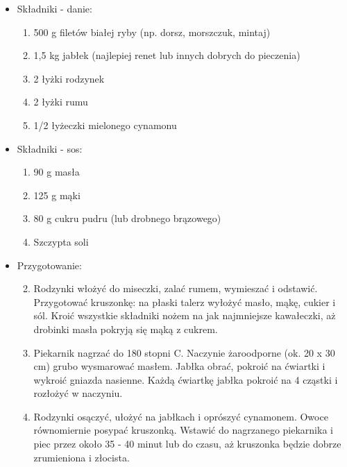 \begin{itemize}
    \item {Składniki - danie:}
    \begin{enumerate}[label={\arabic*\textendash}, align=right]
        \item 500 g filetów białej ryby (np. dorsz, morszczuk, mintaj)
        \item 1,5 kg jabłek (najlepiej renet lub innych dobrych do pieczenia)
        \item 2 łyżki rodzynek
        \item 2 łyżki rumu
        \item 1/2 łyżeczki mielonego cynamonu
    \end{enumerate}
    \end{itemize}
\begin{itemize}
    \item {Składniki - sos:}
    \begin{enumerate}[label=\Alph*:]
        \item 90 g masła
        \item 125 g mąki
        \item 80 g cukru pudru (lub drobnego brązowego)
        \item Szczypta soli
    \end{enumerate}
    \end{itemize}
\begin{itemize}
    \item {Przygotowanie:}
    \begin{enumerate}
    \setcounter{enumi}{1}
        \item Rodzynki włożyć do miseczki, zalać rumem, wymieszać i odstawić. Przygotować kruszonkę: na płaski talerz wyłożyć masło, mąkę, cukier i sól. Kroić wszystkie składniki nożem na jak najmniejsze kawałeczki, aż drobinki masła pokryją się mąką z cukrem.
        \item Piekarnik nagrzać do 180 stopni C. Naczynie żaroodporne (ok. 20 x 30 cm) grubo wysmarować masłem. Jabłka obrać, pokroić na ćwiartki i wykroić gniazda nasienne. Każdą ćwiartkę jabłka pokroić na 4 cząstki i rozłożyć w naczyniu.
        \item Rodzynki osączyć, ułożyć na jabłkach i oprószyć cynamonem. Owoce równomiernie posypać kruszonką. Wstawić do nagrzanego piekarnika i piec przez około 35 - 40 minut lub do czasu, aż kruszonka będzie dobrze zrumieniona i złocista.
    \end{enumerate}
\end{itemize}


























